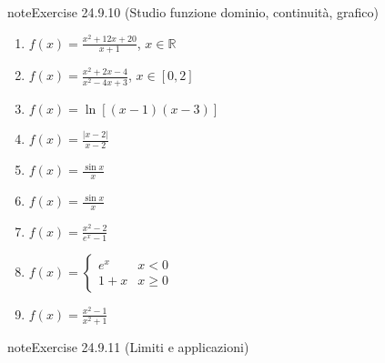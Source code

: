 \documentclass[letterpaper,10pt,italian]{jupyterBook}
\begin{document}
\begin{sphinxadmonition}{note}{Exercise 24.9.10 (Studio funzione \sphinxhyphen{} dominio, continuità, grafico)}
\begin{enumerate}
\item {} 
\sphinxAtStartPar
\(f(x) = \frac{x^2+12 x +20}{x+1}\), \(x \in \mathbb{R}\) 

\item {} 
\sphinxAtStartPar
\(f(x) = \frac{x^2+2x-4}{x^2-4x+3}\), \(x \in [0,2]\) 

\item {} 
\sphinxAtStartPar
\(f(x) = \ln \left[(x-1)(x-3)\right] \)

\item {} 
\sphinxAtStartPar
\(f(x) = \frac{|x-2|}{x-2}\)

\item {} 
\sphinxAtStartPar
\(f(x) = \frac{\sin x}{x}\)

\item {} 
\sphinxAtStartPar
\(f(x) = \frac{\sin x}{x}\)

\item {} 
\sphinxAtStartPar
\(f(x) = \frac{x^2 - 2}{e^x-1}\)

\item {} 
\sphinxAtStartPar
\(f(x) = \begin{cases} e^x & x < 0 \\ 1 + x  & x \ge 0 \end{cases}\)

\item {} 
\sphinxAtStartPar
\(f(x) = \frac{x^2 - 1}{x^2 + 1}\)

\end{enumerate}
\end{sphinxadmonition}
 \label{exercise:ch/infinitesimal_calculus/analysis-problems-exercise-10}

\begin{sphinxadmonition}{note}{Exercise 24.9.11 (Limiti e applicazioni)}




\end{sphinxadmonition}
\end{document}
